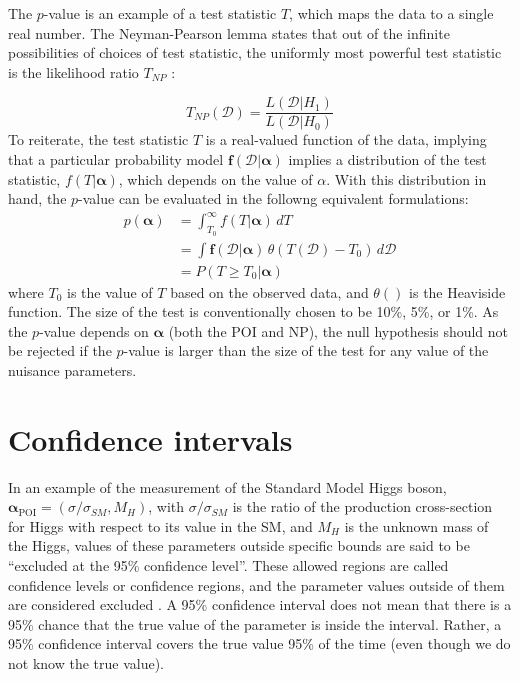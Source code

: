 The $p$-value is an example of a test statistic $T$, which maps the data to a single real number. The Neyman-Pearson lemma states that out of the infinite possibilities of choices of test statistic, the uniformly most powerful test statistic is the likelihood ratio $T_{NP}$ \cite{2011-Statistics-Cranmer}:

\begin{equation}
    T_{NP}(\mathcal{D}) = \frac{L(\mathcal{D} | {H_1})}{L(\mathcal{D}|{H_0})}
\end{equation}
To reiterate, the test statistic $T$ is a real-valued function of the data, implying that a particular probability model $\boldsymbol{f}(\mathcal{D}|\boldsymbol{\alpha})$ implies a distribution of the test statistic, $f(T|\boldsymbol{\alpha})$, which depends on the value of $\alpha$. With this distribution in hand, the $p$-value can be evaluated in the followng equivalent formulations:
\begin{align}
    p(\boldsymbol{\alpha}) &= \int_{T_0}^{\infty} f(T|\boldsymbol{\alpha}) \, dT  \\
              &= \int \boldsymbol{f}(\mathcal{D} | \boldsymbol{\alpha}) \, \theta(T(\mathcal{D}) - T_0) \, d\mathcal{D} \\
              &= P(T \geq T_0 | \boldsymbol{\alpha})
\end{align}
where $T_0$ is the value of $T$ based on the observed data, and $\theta()$ is the Heaviside function. The size of the test is conventionally chosen to be 10\%, 5\%, or 1\%. As the $p$-value depends on $\boldsymbol{\alpha}$ (both the POI and NP), the null hypothesis should not be rejected if the $p$-value is larger than the size of the test for any value of the nuisance parameters.

\section{Confidence intervals}
In an example of the measurement of the Standard Model Higgs boson, $\boldsymbol{\alpha}_{\text{POI}} = (\sigma/ \sigma_{SM}, M_H)$, with $\sigma/\sigma_{SM}$ is the ratio of the production cross-section for Higgs with respect to its value in the SM, and $M_H$ is the unknown mass of the Higgs, values of these parameters outside specific bounds are said to be ``excluded at the 95\% confidence level''. These allowed regions are called confidence levels or confidence regions, and the parameter values outside of them are considered excluded \cite{2011-Statistics-Cranmer}. A 95\% confidence interval does not mean that there is a 95\% chance that the true value of the parameter is inside the interval. Rather, a 95\% confidence interval covers the true value 95\% of the time (even though we do not know the true value). 

